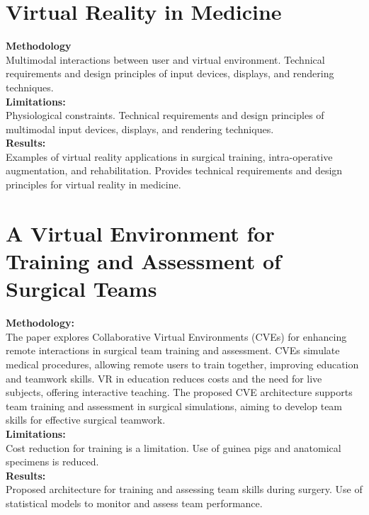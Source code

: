 \section{Virtual Reality in Medicine\cite{JournalArticle}\cite{JournalArticle11}}
\textbf{Methodology}\\Multimodal interactions between user and virtual environment.
Technical requirements and design principles of input devices, displays, and rendering techniques.\\
\textbf{Limitations:}\\Physiological constraints. Technical requirements and design principles of multimodal input devices, displays, and rendering techniques.\\
\textbf{Results:}\\ Examples of virtual reality applications in surgical training, intra-operative augmentation, and rehabilitation. Provides technical requirements and design principles for virtual reality in medicine.
\section{A Virtual Environment for Training and Assessment of Surgical Teams\cite{papagiannakis2018virtual}}
\textbf{Methodology:}\\The paper explores Collaborative Virtual Environments (CVEs) for enhancing remote interactions in surgical team training and assessment. CVEs simulate medical procedures, allowing remote users to train together, improving education and teamwork skills. VR in education reduces costs and the need for live subjects, offering interactive teaching. The proposed CVE architecture supports team training and assessment in surgical simulations, aiming to develop team skills for effective surgical teamwork.\\
\textbf{Limitations:}\\Cost reduction for training is a limitation.
Use of guinea pigs and anatomical specimens is reduced.\\
\textbf{Results:}\\Proposed architecture for training and assessing team skills during surgery. Use of statistical models to monitor and assess team performance.
